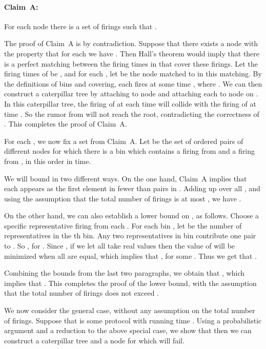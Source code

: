 \paragraph{Claim~A:} For each node  there is a set of firings 
such that .

\smallskip

The proof of Claim~A is by contradiction. Suppose that there exists a node 
with the property that for each  we have .
Then Hall's theorem would imply that there is a perfect matching between the firing times 
in  that cover these firings.
Let the firing times of   be ,
and for each , let  be the node matched to  in this matching.
By the definitions of bins and covering, each 
fires at some time , where .  We can then construct
a caterpillar tree by
attaching  to node  and attaching each  to node  on . 
In this caterpillar tree, the firing of  at each time  will collide with
the firing of  at time . So the rumor from  will not
reach the root, contradicting the correctness of . 
This completes the proof of Claim~A.

\smallskip

For each , we now fix a set  from Claim~A.
Let  be the set of ordered pairs  of different nodes 
for which
there is a bin which contains a firing from  and a firing from ,
in this order in time.

We will bound  in two different ways. On the one hand, Claim~A implies that 
each  appears as the first element in fewer than  pairs in . 
Adding up over all , and using the assumption that the total number of firings
is at most , we have .

On the other hand, we can also establish a lower bound on , as follows.
Choose a specific representative firing  from each . 
For each bin , let  be the number of representatives in the th bin.
Any two representatives in bin  contribute one pair to . 
So , for .
Since , if we let all  take real values then
the value of  will be minimized when all  are equal,
which implies that , for some .
Thus we get that .

Combining the bounds from the last two paragraphs, we obtain that
, which implies that .
This completes the proof of the lower bound, with the assumption that the total
number of firings does not exceed .

\smallskip

We now consider the general case, without any assumption on the total number
of firings. 
Suppose that  is some protocol with running time  .
Using a probabilistic argument and a reduction to the above special case,
we show that then we can construct a 
caterpillar tree and a node  for which  will fail.

